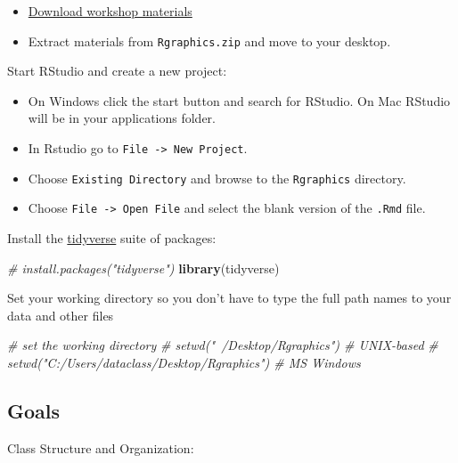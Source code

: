 \documentclass[]{book}
\newenvironment{Shaded}{\begin{snugshade}}{\end{snugshade}}
\newcommand{\KeywordTok}[1]{\textcolor[rgb]{0.13,0.29,0.53}{\textbf{#1}}}
\newcommand{\CommentTok}[1]{\textcolor[rgb]{0.56,0.35,0.01}{\textit{#1}}}
\newcommand{\NormalTok}[1]{#1}
\providecommand{\tightlist}{%
  \setlength{\itemsep}{0pt}\setlength{\parskip}{0pt}}
\begin{document}
\begin{itemize}
\tightlist
\item
  \href{http://tutorials.iq.harvard.edu/R/Rgraphics.zip}{Download
  workshop materials}
\item
  Extract materials from \texttt{Rgraphics.zip} and move to your
  desktop.
\end{itemize}

Start RStudio and create a new project:

\begin{itemize}
\tightlist
\item
  On Windows click the start button and search for RStudio. On Mac
  RStudio will be in your applications folder.
\item
  In Rstudio go to \texttt{File\ -\textgreater{}\ New\ Project}.
\item
  Choose \texttt{Existing\ Directory} and browse to the
  \texttt{Rgraphics} directory.
\item
  Choose \texttt{File\ -\textgreater{}\ Open\ File} and select the blank
  version of the \texttt{.Rmd} file.
\end{itemize}

Install the \href{https://www.tidyverse.org/}{tidyverse} suite of
packages:

\begin{Shaded}
\begin{Highlighting}[]
\CommentTok{# install.packages("tidyverse")}
\KeywordTok{library}\NormalTok{(tidyverse)}
\end{Highlighting}
\end{Shaded}

Set your working directory so you don't have to type the full path names
to your data and other files

\begin{Shaded}
\begin{Highlighting}[]
  \CommentTok{# set the working directory}
  \CommentTok{# setwd("~/Desktop/Rgraphics") # UNIX-based}
  \CommentTok{# setwd("C:/Users/dataclass/Desktop/Rgraphics") # MS Windows}
\end{Highlighting}
\end{Shaded}

\subsection{Goals}\label{goals-2}

Class Structure and Organization:
\end{document}
